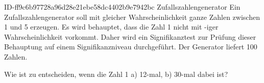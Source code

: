 \begin{exercise}
      {ID-ff9c6b97728a96d28e21ebe58dc4402b9e7942bc}
      {Zufallszahlengenerator}
  \ifproblem\problem
    Ein Zufallszahlengenerator soll mit gleicher Wahrscheinlichkeit ganze
    Zahlen zwischen 1 und 5 erzeugen. Es wird behauptet, dass die Zahl 1
    nicht mit -iger Wahrscheinlichkeit vorkommt. Daher wird ein
    Signifikanztest zur Prüfung dieser Behauptung auf einem Signifikanzniveau
     durchgeführt. Der Generator liefert 100 Zahlen.\par
    Wie ist zu entscheiden, wenn die Zahl 1 a) 12-mal, b) 30-mal dabei ist?
  \fi
\end{exercise}
